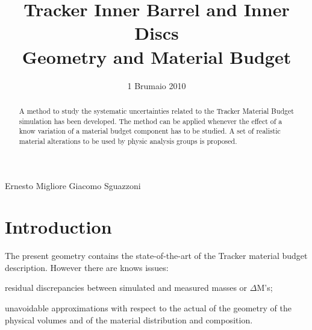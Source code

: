 \documentclass{cmspaper}
\begin{document}
\def \mrad      {{\rm \, mrad}}
\newcommand {\cm}         {\rm   cm}
\newcommand {\mm}         {\rm   mm}
\newcommand {\m}          {\rm   m}
\newcommand {\DM}         {\Delta {\mathrm M}}
\newcommand {\Xo}         {{\mathrm{X}_0}}
\newcommand {\TX}         {{\mathrm{T}_0}}
\newcommand {\tX}         {{\mathrm{t}_0}}
\newcommand {\lI}         {{\lambda_\mathrm{I}}}
\newcommand {\TI}         {{\mathrm{T}_\mathrm{I}}}
\newcommand {\tI}         {{\mathrm{t}_\mathrm{I}}}
\newcommand {\kvect}      {{\vec{k}}}

\renewcommand{\labelenumi}{\alph{enumi})}
\newcommand{\fixme}{{\bf FIXME~}}





\begin{titlepage}

   \date{1 Brumaio 2010}

  \title{Tracker Inner Barrel and Inner Discs\\
  Geometry and Material Budget}

  \begin{Authlist}
    Ernesto Migliore
    Giacomo Sguazzoni
  \end{Authlist}

 
  \begin{abstract}
A method to study the systematic uncertainties related to the Tracker Material Budget simulation has been developed.
The method can be applied whenever the effect of a know variation of a material budget component has to be studied.
A set of realistic material alterations to be used by physic analysis groups is proposed.
  \end{abstract} 

\end{titlepage}

\setcounter{page}{2}%

\section{Introduction}

The present geometry contains the state-of-the-art of the Tracker material budget description. However there are knows issues:
\begin{description}
\item residual discrepancies between simulated and measured masses or $\DM$'s; 
\item unavoidable approximations with respect to the actual of the geometry of the physical volumes and of the material distribution and composition.
\end{description}
\end{document}
